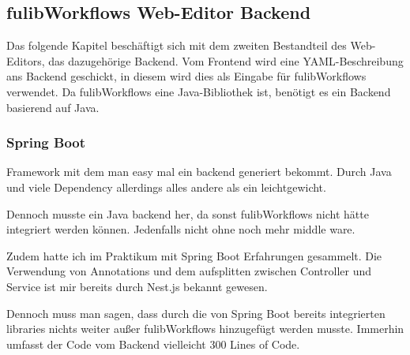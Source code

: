 \subsection{fulibWorkflows Web-Editor Backend}\label{subsec:backend}
Das folgende Kapitel beschäftigt sich mit dem zweiten Bestandteil des Web-Editors, das dazugehörige Backend.
Vom Frontend wird eine YAML-Beschreibung ans Backend geschickt, in diesem wird dies als Eingabe für fulibWorkflows verwendet.
Da fulibWorkflows eine Java-Bibliothek ist, benötigt es ein Backend basierend auf Java.

\subsubsection{Spring Boot}
\todo
Framework mit dem man easy mal ein backend generiert bekommt.
Durch Java und viele Dependency allerdings alles andere als ein leichtgewicht.

Dennoch musste ein Java backend her, da sonst fulibWorkflows nicht hätte integriert werden können.
Jedenfalls nicht ohne noch mehr middle ware.

Zudem hatte ich im Praktikum mit Spring Boot Erfahrungen gesammelt.
Die Verwendung von Annotations und dem aufsplitten zwischen Controller und Service ist mir bereits
durch Nest.js bekannt gewesen.

Dennoch muss man sagen, dass durch die von Spring Boot bereits integrierten libraries nichts weiter
außer fulibWorkflows hinzugefügt werden musste.
Immerhin umfasst der Code vom Backend vielleicht 300 Lines of Code.
